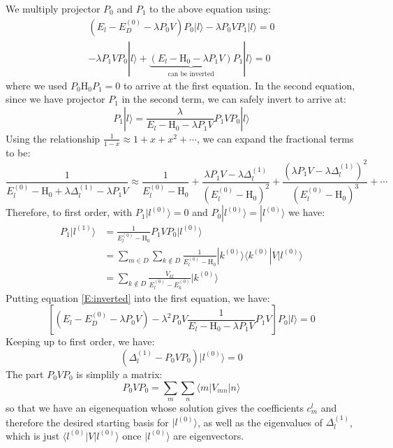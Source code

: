 \documentclass{article}
\newcommand{\huptb}{\text{H}_0}
\newcommand{\order}[2]{#1^{(#2)}}
\newcommand{\statebra}[1]{\langle #1 |}
\newcommand{\stateket}[1]{| #1 \rangle}
\begin{document}
We multiply projector $P_0$ and $P_1$ to the above equation using:
\begin{align}
    (E_l - \order{E_D}{0} - \lambda P_0 V) P_0 \stateket{l} - \lambda P_0 V P_1 \stateket{l} = 0 \\
    - \lambda P_1 V P_0 \stateket{l} + \underbrace{(E_l - \huptb - \lambda P_1 V)}_{\text{can be inverted}} P_1 \stateket{l} = 0
\end{align}
where we used $P_0 \huptb P_1 = 0$ to arrive at the first equation.
In the second equation, since we have projector $P_1$ in the second term, we can safely invert 
to arrive at:
\begin{equation}
    \label{E:inverted}
    P_1 \stateket{l} = \frac{\lambda }{E_l - \huptb - \lambda P_1 V} P_1 V P_0 \stateket{l}
\end{equation}
Using the relationship $\frac{1}{1-x} \approx 1 + x + x^2 + \cdots$, we can expand the fractional 
terms to be:
\begin{equation}
    \frac{1}{\order{E_l}{0} - \huptb + \lambda \order{\Delta_l}{1} - \lambda P_1 V} \approx 
    \frac{1}{\order{E_l}{0} - \huptb} + \frac{\lambda P_1 V - \lambda \order{\Delta_l}{1}}{(\order{E_l}{0} - \huptb)^2}
    + \frac{(\lambda P_1 V - \lambda \order{\Delta_l}{1})^2}{(\order{E_l}{0} - \huptb)^3} + \cdots
\end{equation}
Therefore, to first order, with $P_1 \stateket{\order{l}{0}} = 0$ 
and $P_0 \stateket{\order{l}{0}} = \stateket{\order{l}{0}}$ we have:
\begin{align}
    P_1 \stateket{\order{l}{1}} &= \frac{1}{\order{E_l}{0} - \huptb} P_1 V P_0 \stateket{\order{l}{0}} \\ 
    &= \sum_{m\in D}\sum_{ k\notin D} \frac{1}{\order{E_l}{0} - \huptb} 
    \stateket{\order{k}{0}} \statebra{ \order{k}{0} } V \stateket{\order{l}{0}} \\ 
    &= \sum_{k\notin D} \frac{V_{kl}}{\order{E_l}{0} - \order{E_k}{0}} \stateket{\order{k}{0}}
\end{align}
Putting equation \eqref{E:inverted} into the first equation, we have:
\begin{equation}
    \label{E:degenerate_main}
    \left[ (E_l - \order{E_D}{0} - \lambda P_0 V) - \lambda^2 P_0 V \frac{1}{E_l - \huptb - \lambda P_1 V} P_1 V \right] P_0 \stateket{l} = 0
\end{equation}
Keeping up to first order, we have:
\begin{equation}
    \left( \order{\Delta_l}{1} - P_0 V P_0 \right) \stateket{\order{l}{0}} = 0
\end{equation}
The part $P_0 V P_0$ is simplily a matrix:
\begin{equation}
    P_0 V P_0 = \sum_m \sum_n \statebra{m} V_{mn} \stateket{n}
\end{equation}
so that we have an eigenequation whose solution gives the coefficients $c_m^l$ and 
therefore the desired starting basis for $\stateket{\order{l}{0}}$, as well as the 
eigenvalues of $\order{\Delta_l}{1}$, which is just $\statebra{\order{l}{0}} V \stateket{\order{l}{0}}$
once $\stateket{\order{l}{0}}$ are eigenvectors.
\end{document}
